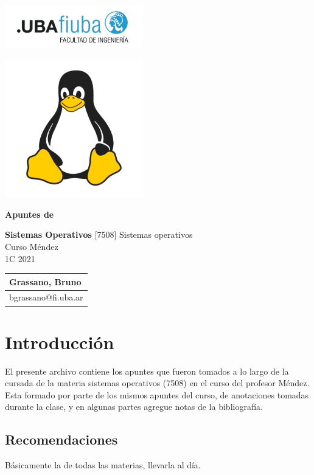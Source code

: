 \documentclass[titlepage,a4paper]{article}
\begin{document}
\begin{titlepage} %
	\hfill\includegraphics[width=6cm]{logofiuba.jpg}
    \centering
    \vfill
    
    \includegraphics[width=6cm]{ImagenesApunte/LogoLinux.png}
    
    \Huge \textbf{Apuntes de}
    
    \Huge \textbf{Sistemas Operativos}
    \vskip2cm
    \Large [7508] Sistemas operativos\\
    Curso Méndez \\
    1C 2021
    \vfill
    \begin{tabular}{ | l | } %
      \hline
      Grassano, Bruno \\ \hline
      bgrassano@fi.uba.ar \\ \hline
  	\end{tabular}
    \vfill
    \vfill
\end{titlepage}

\tableofcontents %

\newpage

\section{Introducción}\label{sec:intro}
El presente archivo contiene los apuntes que fueron tomados a lo largo de la cursada de la materia sistemas operativos (7508) en el curso del profesor Méndez. Esta formado por parte de los mismos apuntes del curso, de anotaciones tomadas durante la clase, y en algunas partes agregue notas de la bibliografía. 

\subsection*{Recomendaciones}
Básicamente la de todas las materias, llevarla al día.
\end{document}
